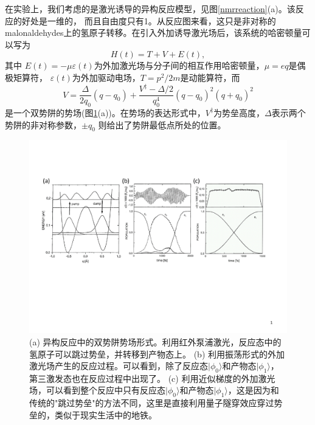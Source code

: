  在实验上，我们考虑的是激光诱导的异构反应模型\cite{nmrdym1}，见图\ref{nmrreaction}(a)。该反应的好处是一维的，
 而且自由度只有1。从反应图来看，这只是非对称的malonaldehydes上的氢原子转移。在引入外加诱导激光场后，该系统的哈密顿量可以写为
\begin{equation}
  H(t)=  T+  V+  E(t) ,
\end{equation}
其中  $E(t)=- \mu\varepsilon(t)$为外加激光场与分子间的相互作用哈密顿量，$ \mu=e  q$是偶极矩算符，
$\varepsilon(t)$为外加驱动电场，$ {T}={  p}^2/2m$是动能算符，而
\begin{equation}
 {V}=\frac{\Delta}{2q_0}(  q-q_0)+\frac{V^\ddag-\Delta/2}{q_0^4}(  q-q_0)^2(  q+q_0)^2
\end{equation}
是一个双势阱的势场(图\ref{dymmodel}(a))。在势场的表达形式中，$V^\ddag$为势垒高度，$\Delta$表示两个势阱的非对称参数，$\pm q_0$
则给出了势阱最低点所处的位置。

 \begin{figure}[htbp]
            \begin{center}
              \includegraphics[width= 0.8\columnwidth]{figures/dymmodel.pdf}
              \caption{(a) 异构反应中的双势阱势场形式。利用红外泵浦激光，反应态中的氢原子可以跳过势垒，并转移到产物态上。
              (b) 利用振荡形式的外加激光场产生的反应过程。可以看到，除了反应态$|\phi_0 \rangle$和产物态$|\phi_1 \rangle$，第三激发态也在反应过程中出现了。
              (c) 利用近似梯度的外加激光场，可以看到整个反应中只有反应态$|\phi_0 \rangle$和产物态$|\phi_1 \rangle$，这是因为和传统的"跳过势垒"的方法不同，这里是直接利用量子隧穿效应穿过势垒的，类似于现实生活中的地铁。 }\label{dymmodel}
            \end{center}
 \end{figure}

